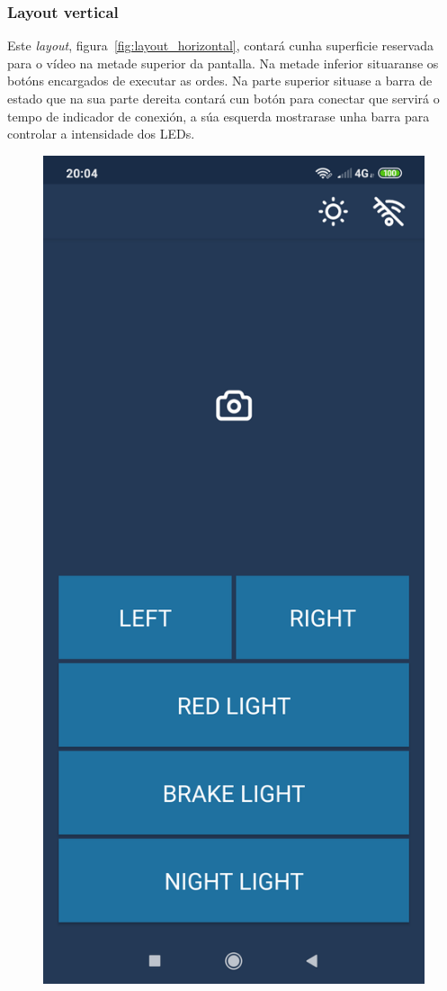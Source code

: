 \subsubsection{Layout vertical}
Este \emph{layout}, figura~\ref{fig:layout_horizontal}, contará cunha superficie reservada para o vídeo na metade superior da pantalla. Na metade inferior situaranse os botóns encargados de executar as ordes. Na parte superior situase a barra de estado que na sua parte dereita contará cun botón para conectar que servirá o tempo de indicador de conexión, a súa esquerda mostrarase unha barra para controlar a intensidade dos LEDs.
\begin{figure}[tbp]
  \centering
  \includegraphics[scale=.1]{imaxes/layout-vertical1.png}

\end{figure}
